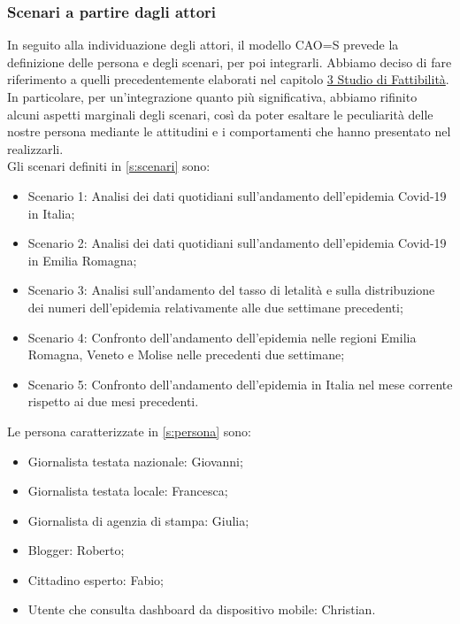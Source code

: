 \noindent
\subsubsection{Scenari a partire dagli attori}
\label{sss:scenari-a-partire-da-attori}
In seguito alla individuazione degli attori, il modello CAO=S prevede la definizione delle persona e degli scenari, per poi integrarli.
Abbiamo deciso di fare riferimento a quelli precedentemente elaborati nel capitolo \hyperref[c:studio-fattibilita]{3 Studio di Fattibilità}.
In particolare, per un'integrazione quanto più significativa, abbiamo rifinito alcuni aspetti marginali degli scenari, così da poter esaltare le peculiarità delle nostre persona mediante le attitudini e i comportamenti che hanno presentato nel realizzarli.\\
Gli scenari definiti in \ref{s:scenari} sono:
\begin{itemize}
    \item Scenario 1: Analisi dei dati quotidiani sull'andamento dell'epidemia Covid-19 in Italia;
    \item Scenario 2: Analisi dei dati quotidiani sull'andamento dell'epidemia Covid-19 in Emilia Romagna;
    \item Scenario 3: Analisi sull'andamento del tasso di letalità e sulla distribuzione dei numeri dell'epidemia relativamente alle due settimane precedenti;
    \item Scenario 4: Confronto dell'andamento dell'epidemia nelle regioni Emilia Romagna, Veneto e Molise nelle precedenti due settimane;
    \item Scenario 5: Confronto dell'andamento dell'epidemia in Italia nel mese corrente rispetto ai due mesi precedenti.
\end{itemize}
Le persona caratterizzate in \ref{s:persona} sono:
\begin{itemize}
    \item Giornalista testata nazionale: Giovanni;
    \item Giornalista testata locale: Francesca;
    \item Giornalista di agenzia di stampa: Giulia;
    \item Blogger: Roberto;
    \item Cittadino esperto: Fabio;
    \item Utente che consulta dashboard da dispositivo mobile: Christian.
\end{itemize}
\noindent
